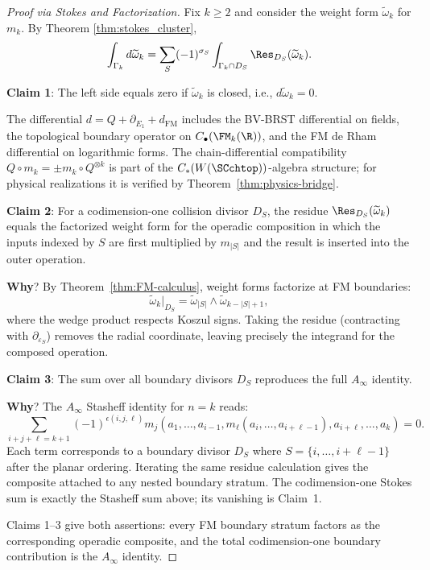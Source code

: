 \begin{proof}[Proof via Stokes and Factorization]
Fix $k \geq 2$ and consider the weight form $\widetilde{\omega}_k$ for $m_k$. By Theorem \ref{thm:stokes_cluster},
\[
\int_{\Gamma_k} d\widetilde{\omega}_k = \sum_{S} (-1)^{\sigma_S} \int_{\Gamma_k \cap D_S} \Res_{D_S}(\widetilde{\omega}_k).
\]

\textbf{Claim 1}: The left side equals zero if $\widetilde{\omega}_k$ is closed, i.e., $d\widetilde{\omega}_k = 0$.

The differential $d = Q + \partial_{E_1} + d_{\mathrm{FM}}$ includes the BV-BRST differential on fields, the topological boundary operator on $C_\bullet(\FM_k(\R))$, and the FM de Rham differential on logarithmic forms. The chain-differential compatibility $Q \circ m_k = \pm m_k \circ Q^{\otimes k}$ is part of the $C_\ast(W(\SCchtop))$-algebra structure; for physical realizations it is verified by Theorem~\ref{thm:physics-bridge}.

\textbf{Claim 2}: For a codimension-one collision divisor $D_S$,
the residue $\Res_{D_S}(\widetilde{\omega}_k)$ equals the factorized
weight form for the operadic composition in which the inputs indexed by
$S$ are first multiplied by $m_{|S|}$ and the result is inserted into
the outer operation.

\textbf{Why}? By Theorem~\ref{thm:FM-calculus}, weight forms factorize at FM boundaries:
\[
\widetilde{\omega}_k|_{D_S}
=
\widetilde{\omega}_{|S|}
\wedge
\widetilde{\omega}_{k-|S|+1},
\]
where the wedge product respects Koszul signs. Taking the residue (contracting with $\partial_{\varepsilon_S}$) removes the radial coordinate, leaving precisely the integrand for the composed operation.

\textbf{Claim 3}: The sum over all boundary divisors $D_S$ reproduces the full $A_\infty$ identity.

\textbf{Why}? The $A_\infty$ Stasheff identity for $n = k$ reads:
\[
\sum_{i+j+\ell = k+1} (-1)^{\epsilon(i,j,\ell)} m_j(a_1, \ldots, a_{i-1}, m_\ell(a_i, \ldots, a_{i+\ell-1}), a_{i+\ell}, \ldots, a_k) = 0.
\]
Each term corresponds to a boundary divisor $D_S$ where
$S = \{i, \ldots, i+\ell-1\}$ after the planar ordering. Iterating
the same residue calculation gives the composite attached to any
nested boundary stratum. The codimension-one Stokes sum is exactly the
Stasheff sum above; its vanishing is Claim~1.

Claims 1--3 give both assertions: every FM boundary stratum factors as
the corresponding operadic composite, and the total codimension-one
boundary contribution is the $A_\infty$ identity.
\end{proof}


